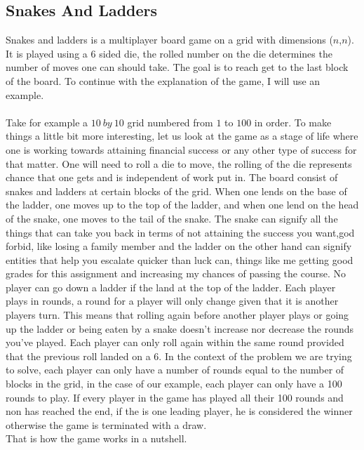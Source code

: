 \subsection*{Snakes And Ladders}
Snakes and ladders is a multiplayer board game on a grid with dimensions ($n$,$n$). It is played using a 6 sided die, the rolled number on the die determines the number of moves one can should take. The goal is to reach get to the last block of the board. To continue with the explanation of the game, I will use an example. \\ \\
Take for example a $10\ by\ 10$ grid numbered from $1$ to $100$ in order. To make things a little bit more interesting, let us look at the game as a stage of life where one is working towards attaining financial success or any other type of success for that matter. One will need to roll a die to move, the rolling of the die represents chance that one gets and is independent of work put in. The board consist of snakes and ladders at certain blocks of the grid. When one lends on the base of the ladder, one moves up to the top of the ladder, and when one lend on the head of the snake, one moves to the tail of the snake. The snake can signify all the things that can take you back in terms of not attaining the success you want,god forbid, like losing a family member and the ladder on the other hand can signify entities that help you escalate quicker than luck can, things like me getting good grades for this assignment and increasing my chances of passing the course. No player can go down a ladder if the land at the top of the ladder. Each player plays in rounds, a round for a player will only change given that it is another players turn. This means that rolling again before another player plays or going up the ladder or being eaten by a snake doesn't increase nor decrease the rounds you've played. Each player can only roll again within the same round provided that the previous roll landed on a 6. In the context of the problem we are trying to solve, each player can only have a number of rounds equal to the number of blocks in the grid, in the case of our example, each player can only have a 100 rounds to play. If every player in the game has played all their 100 rounds and non has reached the end, if the is one leading player, he is considered the winner otherwise the game is terminated with a draw.\\
That is how the game works in a nutshell.

